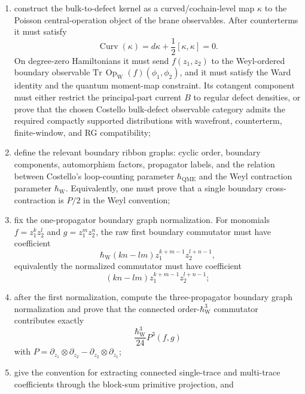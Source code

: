 \documentclass[11pt]{memoir}
\begin{document}
\begin{prob}
\begin{enumerate}
$$	        +(Q+\{I_0,-\})C=0.$$
	      The proved local mechanisms here are the specified supertrace and
	      central-character normalizations; any exhaustive classification is
	      controlled by the displayed obstruction complex;
	    \item construct the bulk-to-defect kernel as a curved/cochain-level map
	      \(\kappa\) to the Poisson central-operation object of the brane
	      observables. After counterterms it must satisfy
	      \[
	        \operatorname{Curv}(\kappa)
	          =d\kappa+\frac12[\kappa,\kappa]=0.
	      \]
	      On degree-zero Hamiltonians it must send \(f(z_1,z_2)\) to the
	      Weyl-ordered boundary observable
	      \(\mathrm{Tr}\,\operatorname{Op}_{\mathrm W}(f)(\phi_1,\phi_2)\),
	      and it must satisfy the Ward identity and the quantum moment-map
	      constraint. Its cotangent component must either restrict the
	      principal-part current \(B\) to regular defect densities, or prove
	      that the chosen Costello bulk-defect observable category admits the
	      required compactly supported distributions with wavefront,
	      counterterm, finite-window, and RG compatibility;
    \item define the relevant boundary ribbon graphs: cyclic order, boundary
	      components, automorphism factors, propagator labels, and the relation
	      between Costello's loop-counting parameter \(\hbar_{\mathrm{QME}}\)
	      and the Weyl contraction parameter \(\hbar_{\mathrm{W}}\).
	      Equivalently, one must prove that a single boundary
      cross-contraction is $P/2$ in the Weyl convention;
    \item fix the one-propagator boundary graph normalization. For monomials
      $f=z_1^kz_2^l$ and $g=z_1^mz_2^n$, the raw first boundary commutator must
      have coefficient
	      $$\hbar_{\mathrm{W}}(kn-lm)z_1^{k+m-1}z_2^{l+n-1},$$
      equivalently the normalized commutator must have coefficient
      $$(kn-lm)z_1^{k+m-1}z_2^{l+n-1};$$
    \item after the first normalization, compute the three-propagator boundary
      graph normalization and prove that the connected order-\(\hbar_{\mathrm{W}}^3\)
      commutator contributes exactly
      $$\frac{\hbar_{\mathrm{W}}^3}{24}P^3(f,g)$$
      with $P=\partial_{z_1}\otimes\partial_{z_2}
      -\partial_{z_2}\otimes\partial_{z_1}$;
	    \item give the convention for extracting connected single-trace and
	      multi-trace coefficients through the block-sum primitive
	      projection, and

\end{enumerate}
\end{prob}
\end{document}

